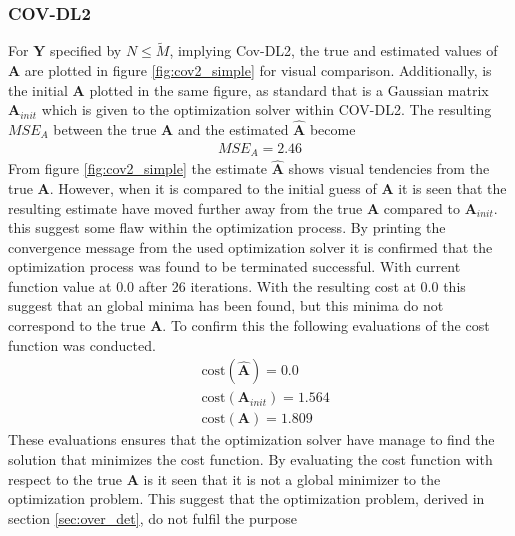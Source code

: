 \subsubsection{COV-DL2}
For $\textbf{Y}$ specified by $N\leq \widetilde{M}$, implying Cov-DL2, the true and estimated values of $\textbf{A}$ are plotted in figure \ref{fig:cov2_simple} for visual comparison. Additionally, is the initial $\textbf{A}$ plotted in the same figure, as standard that is a Gaussian matrix $\textbf{A}_{init}$ which is given to the optimization solver within COV-DL2.    
The resulting $MSE_{A}$ between the true $\textbf{A}$ and the estimated $\hat{\textbf{A}}$ become 
\begin{align*}
MSE_{A} = 2.46 
\end{align*}
From figure \ref{fig:cov2_simple} the estimate $\hat{\textbf{A}}$ shows visual tendencies from the true $\textbf{A}$. However, when it is compared to the initial guess of $\textbf{A}$ it is seen that the resulting estimate have moved further away from the true $\textbf{A}$ compared to $\textbf{A}_{init}$. this suggest some flaw within the optimization process. By printing the convergence message from the used optimization solver it is confirmed that the optimization process was found to be terminated successful. With current function value at $0.0$ after 26 iterations. 
With the resulting cost at 0.0 this suggest that an global minima has been found, but this minima do not correspond to the true $\textbf{A}$.    
To confirm this the following evaluations of the cost function was conducted. 
\begin{align*}
&\text{cost}(\hat{\textbf{A}}) = 0.0\\
&\text{cost}(\textbf{A}_{init}) = 1.564\\
&\text{cost}(\textbf{A}) = 1.809
\end{align*}
These evaluations ensures that the optimization solver have manage to find the solution that minimizes the cost function. By evaluating the cost function with respect to the true $\textbf{A}$ is it seen that it is not a global minimizer to the optimization problem. This suggest that the optimization problem, derived in section \ref{sec:over_det}, do not fulfil the purpose    

